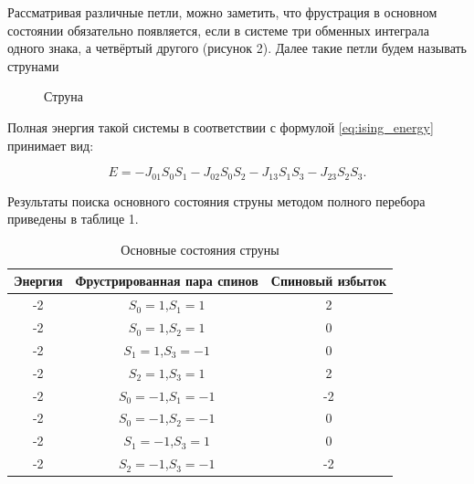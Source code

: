 \documentclass[utf8, babel, sor, jor, amsmath,amssymb, reprint]{elsarticle} %
\begin{document}
Рассматривая различные петли, можно заметить, что фрустрация в основном состоянии обязательно появляется, если в системе три обменных интеграла одного знака, а четвёртый другого (рисунок 2). Далее такие петли будем называть струнами

\begin{figure}[h]
	\centering
	\caption{Струна}
	\label{fig:struna}
\end{figure}

Полная энергия такой системы в соответствии с формулой \eqref{eq:ising_energy} принимает вид:

\begin{equation}
	E = -J_{01} S_0 S_1-J_{02} S_0 S_2-J_{13} S_1 S_3-J_{23} S_2 S_3.
	\label{eq:ising_energy_2x2}
\end{equation}

Результаты поиска основного состояния струны методом полного перебора приведены в таблице 1.

\begin{table}[h]
	\centering
	\begin{tabular}{|c|c|c|}
		\hline
	Энергия & Фрустрированная пара спинов & Спиновый избыток \\
	\hline
	-2 & $S_0=1$,$S_1=1$ & 2\\
	\hline
	-2	& $S_0=1$,$S_2=1$ &	0\\
	\hline
	-2 & 	$S_1=1$,$S_3=-1$ &	0\\
	\hline
	-2 &	$S_2=1$,$S_3=1$	& 2\\
	\hline
	-2 &	$S_0=-1$,$S_1=-1$ &	-2\\
	\hline
	-2 &	$S_0=-1$,$S_2=-1$ &	0\\
	\hline
	-2 &	$S_1=-1$,$S_3=1$ &	0\\
	\hline
	-2 &	$S_2=-1$,$S_3=-1$ & -2\\
		\hline
	\end{tabular}
	\caption{Основные состояния струны}
	\label{tab:Strunags}
\end{table}
\end{document}

